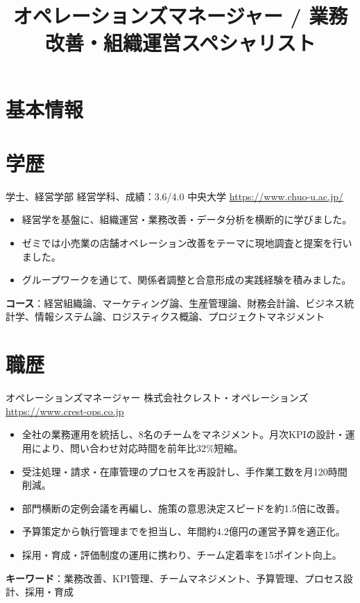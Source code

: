\documentclass[a4paper, serif, 10pt]{moderncv}
\title{オペレーションズマネージャー / 業務改善・組織運営スペシャリスト}
\begin{document}
\maketitle

\section{基本情報}

\section{学歴}

        {学士、経営学部 経営学科、成績：3.6/4.0}
        {中央大学}
        {\url{https://www.chuo-u.ac.jp/}}
        {}
        {\begin{itemize}
\item 経営学を基盤に、組織運営・業務改善・データ分析を横断的に学びました。
\item ゼミでは小売業の店舗オペレーション改善をテーマに現地調査と提案を行いました。
\item グループワークを通じて、関係者調整と合意形成の実践経験を積みました。
\end{itemize}
\textbf{コース}：経営組織論、マーケティング論、生産管理論、財務会計論、ビジネス統計学、情報システム論、ロジスティクス概論、プロジェクトマネジメント}
\section{職歴}

        {オペレーションズマネージャー}
        {株式会社クレスト・オペレーションズ}
        {\url{https://www.crest-ops.co.jp}}
        {}
        {\begin{itemize}
\item 全社の業務運用を統括し、8名のチームをマネジメント。月次KPIの設計・運用により、問い合わせ対応時間を前年比32\%短縮。
\item 受注処理・請求・在庫管理のプロセスを再設計し、手作業工数を月120時間削減。
\item 部門横断の定例会議を再編し、施策の意思決定スピードを約1.5倍に改善。
\item 予算策定から執行管理までを担当し、年間約4.2億円の運営予算を適正化。
\item 採用・育成・評価制度の運用に携わり、チーム定着率を15ポイント向上。
\end{itemize}
\textbf{キーワード}：業務改善、KPI管理、チームマネジメント、予算管理、プロセス設計、採用・育成}
\end{document}
